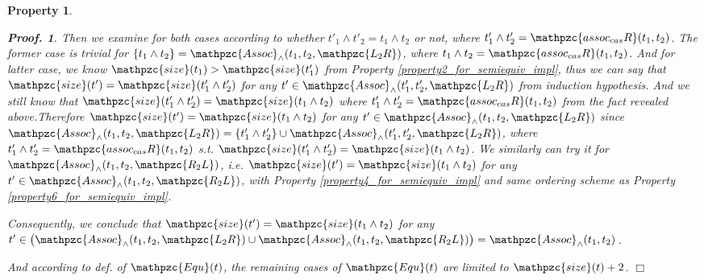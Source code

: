 \documentclass[12pt]{article}
\newtheorem{Property}{Property}[section]
\newtheorem{Proof}{Proof.}
\begin{document}
\begin{Property}
\begin{Proof}
    Then we examine for both cases according to whether
    $t'_1 \wedge t'_2 = t_1 \wedge t_2$ or not, where
    $t'_1 \wedge t'_2 = \mathpzc{assoc_{cas}R}(t_1, t_2)$. The former case
    is trivial for
    $\{t_1 \wedge t_2\} = \mathpzc{Assoc}_\wedge(t_1, t_2, \mathpzc{L_2R})$,
    where $t_1 \wedge t_2 = \mathpzc{assoc_{cas}R}(t_1, t_2)$. And for
    latter case, we know $\mathpzc{size}(t_1) >  \mathpzc{size}(t'_1)$
    from Property \ref{property2_for_semiequiv_impl}, thus we can say that
    $\mathpzc{size}(t') = \mathpzc{size}(t'_1 \wedge t'_2)$ for any
    $t' \in \mathpzc{Assoc}_\wedge(t'_1, t'_2, \mathpzc{L_2R})$ from
    induction hypothesis. And we still know that
    $\mathpzc{size}(t'_1 \wedge t'_2) = \mathpzc{size}(t_1 \wedge t_2)$
    where $t'_1 \wedge t'_2 = \mathpzc{assoc_{cas}R}(t_1, t_2)$ from
    the fact revealed above.Therefore
    $\mathpzc{size}(t') = \mathpzc{size}(t_1 \wedge t_2)$ for any
    $t' \in \mathpzc{Assoc}_\wedge(t_1, t_2, \mathpzc{L_2R})$ since
    $\mathpzc{Assoc}_\wedge(t_1, t_2, \mathpzc{L_2R}) = \{t'_1 \wedge t'_2\}
    \cup \mathpzc{Assoc}_\wedge(t'_1, t'_2, \mathpzc{L_2R})$, where
    $t'_1 \wedge t'_2 = \mathpzc{assoc_{cas}R}(t_1, t_2)$ s.t.
    $\mathpzc{size}(t'_1 \wedge t'_2) = \mathpzc{size}(t_1 \wedge t_2)$.
    We similarly can try it for
    $\mathpzc{Assoc}_\wedge(t_1, t_2, \mathpzc{R_2L})$, i.e.
    $\mathpzc{size}(t') = \mathpzc{size}(t_1 \wedge t_2)$ for any
    $t' \in \mathpzc{Assoc}_\wedge(t_1, t_2, \mathpzc{R_2L})$, 
    with Property \ref{property4_for_semiequiv_impl} and same
    ordering scheme as Property \ref{property6_for_semiequiv_impl}.
    
    Consequently, we conclude that
    $\mathpzc{size}(t') = \mathpzc{size}(t_1 \wedge t_2)$ for any
    $t' \in \bigl(\mathpzc{Assoc}_\wedge(t_1, t_2, \mathpzc{L_2R}) \cup
    \mathpzc{Assoc}_\wedge(t_1, t_2, \mathpzc{R_2L}) \bigr) =
    \mathpzc{Assoc}_\wedge(t_1, t_2)$.
    
    And according to def. of $\mathpzc{Equ}(t)$, the remaining cases of
    $\mathpzc{Equ}(t)$ are limited to $\mathpzc{size}(t) + 2$.
    $\Box$
  \end{Proof}
\end{Property}
\end{document}
